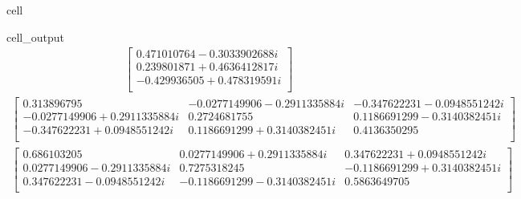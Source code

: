 \documentclass[letterpaper,10pt,english]{jupyterBook}
\begin{document}
\begin{sphinxuseclass}{cell}
\begin{sphinxVerbatimOutput}
\begin{sphinxuseclass}{cell_output}\begin{equation*}
\begin{split}\begin{bmatrix}
0.471010764 - 0.3033902688 i  \\
 0.239801871 + 0.4636412817 i  \\
 -0.429936505 + 0.478319591 i  \\
 \end{bmatrix}
\end{split}
\end{equation*}\begin{equation*}
\begin{split}\begin{bmatrix}
0.313896795 & -0.0277149906 - 0.2911335884 i & -0.347622231 - 0.0948551242 i  \\
 -0.0277149906 + 0.2911335884 i & 0.2724681755 & 0.1186691299 - 0.3140382451 i  \\
 -0.347622231 + 0.0948551242 i & 0.1186691299 + 0.3140382451 i & 0.4136350295  \\
 \end{bmatrix}
\end{split}
\end{equation*}\begin{equation*}
\begin{split}\begin{bmatrix}
0.686103205 & 0.0277149906 + 0.2911335884 i & 0.347622231 + 0.0948551242 i  \\
 0.0277149906 - 0.2911335884 i & 0.7275318245 & -0.1186691299 + 0.3140382451 i  \\
 0.347622231 - 0.0948551242 i & -0.1186691299 - 0.3140382451 i & 0.5863649705  \\
 \end{bmatrix}
\end{split}
\end{equation*}
\end{sphinxuseclass}\end{sphinxVerbatimOutput}

\end{sphinxuseclass}
\end{document}
